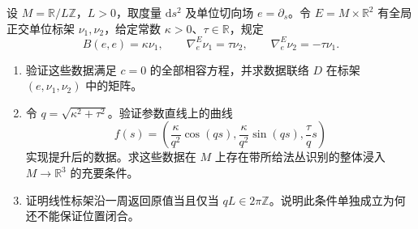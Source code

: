 \begin{exercise}\label{g3:ex:closed-curve-data-monodromy}
	设 \(M=\mathbb R/L\mathbb Z\)，\(L>0\)，取度量 \(\mathrm ds^2\) 及单位切向场 \(e=\partial_s\)。令 \(E=M\times\mathbb R^2\) 有全局正交单位标架 \(\nu_1,\nu_2\)，给定常数 \(\kappa>0\)、\(\tau\in\mathbb R\)，规定
	\[
		B(e,e)=\kappa\nu_1,\qquad
		\nabla^E_e\nu_1=\tau\nu_2,\qquad
		\nabla^E_e\nu_2=-\tau\nu_1.
	\]
	\begin{enumerate}
		\item 验证这些数据满足 \(c=0\) 的全部相容方程，并求数据联络 \(D\) 在标架 \((e,\nu_1,\nu_2)\) 中的矩阵。
		\item 令 \(q=\sqrt{\kappa^2+\tau^2}\)。验证参数直线上的曲线
		\[
			f(s)=\left(\frac{\kappa}{q^2}\cos(qs),
			\frac{\kappa}{q^2}\sin(qs),\frac{\tau}{q}s\right)
		\]
		实现提升后的数据。求这些数据在 \(M\) 上存在带所给法丛识别的整体浸入 \(M\to\mathbb R^3\) 的充要条件。
		\item 证明线性标架沿一周返回原值当且仅当 \(qL\in2\pi\mathbb Z\)。说明此条件单独成立为何还不能保证位置闭合。
	\end{enumerate}
\end{exercise}
